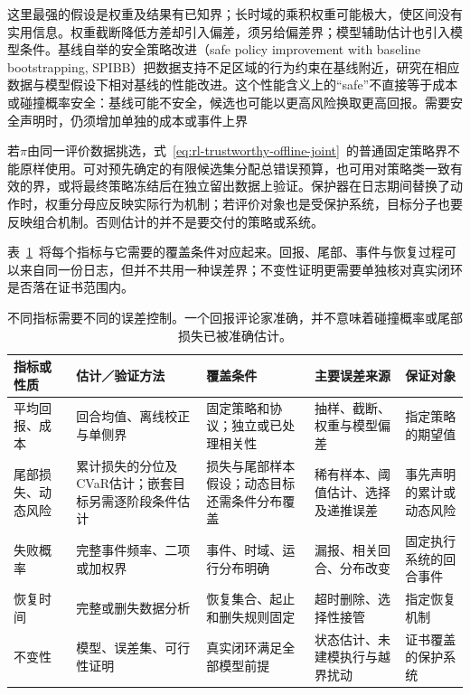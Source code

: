 这里最强的假设是权重及结果有已知界；长时域的乘积权重可能极大，使区间没有实用信息。权重截断降低方差却引入偏差，须另给偏差界；模型辅助估计也引入模型条件。基线自举的安全策略改进（safe policy improvement with baseline bootstrapping, SPIBB）把数据支持不足区域的行为约束在基线附近，研究在相应数据与模型假设下相对基线的性能改进。这个性能含义上的“safe”不直接等于成本或碰撞概率安全：基线可能不安全，候选也可能以更高风险换取更高回报。需要安全声明时，仍须增加单独的成本或事件上界

若$\pi$由同一评价数据挑选，式~\eqref{eq:rl-trustworthy-offline-joint}~的普通固定策略界不能原样使用。可对预先确定的有限候选集分配总错误预算，也可用对策略类一致有效的界，或将最终策略冻结后在独立留出数据上验证。保护器在日志期间替换了动作时，权重分母应反映实际行为机制；若评价对象也是受保护系统，目标分子也要反映组合机制。否则估计的并不是要交付的策略或系统。

表~\ref{tab:rl-trustworthy-indicators}~将每个指标与它需要的覆盖条件对应起来。回报、尾部、事件与恢复过程可以来自同一份日志，但并不共用一种误差界；不变性证明更需要单独核对真实闭环是否落在证书范围内。

\begin{table}[t]
  \centering
  \begin{tabularx}{\linewidth}{@{}>{\raggedright\arraybackslash}p{19mm}XXXX@{}}
    \toprule
    指标或性质 & 估计／验证方法 & 覆盖条件 & 主要误差来源 & 保证对象 \\
    \midrule
    平均回报、成本 & 回合均值、离线校正与单侧界 & 固定策略和协议；独立或已处理相关性 & 抽样、截断、权重与模型偏差 & 指定策略的期望值 \\
    尾部损失、动态风险 & 累计损失的分位及CVaR估计；嵌套目标另需逐阶段条件估计 & 损失与尾部样本假设；动态目标还需条件分布覆盖 & 稀有样本、阈值估计、选择及递推误差 & 事先声明的累计或动态风险 \\
    失败概率 & 完整事件频率、二项或加权界 & 事件、时域、运行分布明确 & 漏报、相关回合、分布改变 & 固定执行系统的回合事件 \\
    恢复时间 & 完整或删失数据分析 & 恢复集合、起止和删失规则固定 & 超时删除、选择性接管 & 指定恢复机制 \\
    不变性 & 模型、误差集、可行性证明 & 真实闭环满足全部模型前提 & 状态估计、未建模执行与越界扰动 & 证书覆盖的保护系统 \\
    \bottomrule
  \end{tabularx}
  \caption{不同指标需要不同的误差控制。一个回报评论家准确，并不意味着碰撞概率或尾部损失已被准确估计。}
  \label{tab:rl-trustworthy-indicators}
\end{table}

